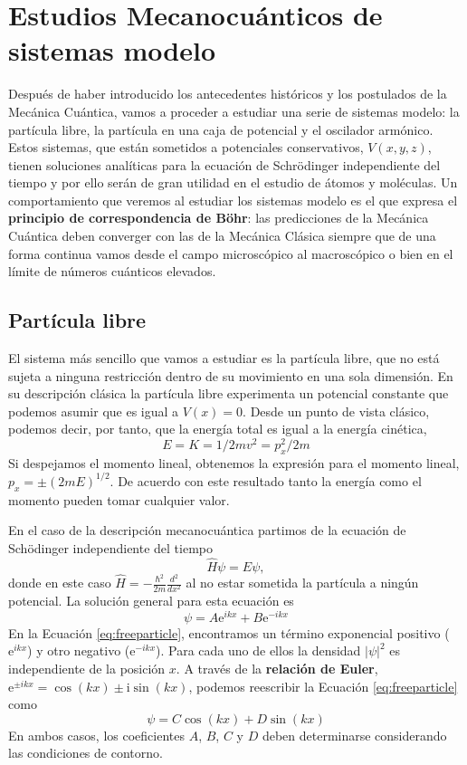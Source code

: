 \chapter{Estudios Mecanocuánticos de sistemas modelo}
Después de haber introducido los antecedentes históricos y los
postulados de la Mecánica Cuántica, vamos a proceder a 
estudiar una serie de sistemas modelo: la partícula libre, la
partícula en una caja de potencial y el oscilador armónico.
Estos sistemas, que están sometidos a potenciales conservativos,
$V(x,y,z)$, tienen soluciones analíticas para la ecuación 
de Schrödinger independiente del tiempo y por ello serán de gran
utilidad en el estudio de átomos y moléculas. Un comportamiento
que veremos al estudiar los sistemas modelo es el que expresa
el \textbf{principio de correspondencia de Böhr}:
las predicciones de la Mecánica Cuántica deben converger con 
las de la Mecánica Clásica siempre que de una forma continua vamos 
desde el campo microscópico al macroscópico o bien en el límite
de números cuánticos elevados.

\section{Partícula libre}
El sistema más sencillo que vamos a estudiar es la partícula libre,
que no está sujeta a ninguna restricción dentro de su movimiento
en una sola dimensión. En su descripción clásica la partícula libre
experimenta un potencial constante que podemos asumir que es igual a
$V(x)=0$. Desde un punto de vista clásico, podemos decir, por tanto,
que la energía total es igual a la energía cinética,
\begin{equation}
    E=K=1/2mv^2=p_x^2/2m
\end{equation}
Si despejamos el momento lineal, obtenemos la expresión para el
momento lineal, $p_x=\pm(2mE)^{1/2}$. De acuerdo con este resultado
tanto la energía como el momento pueden tomar cualquier valor.

En el caso de la descripción mecanocuántica partimos de 
la ecuación de Schödinger independiente del tiempo
\begin{equation}
    \hat{H}\psi=E\psi,
\end{equation}
donde en este caso $\hat{H}=-\frac{\hbar^2}{2m}\frac{d^2}{dx^2}$ al
no estar sometida la partícula a ningún potencial. La solución
general para esta ecuación es
\begin{equation}
    \psi = A\mathrm{e}^{ikx}+ B\mathrm{e}^{-ikx}\label{eq:freeparticle}
\end{equation}
En la Ecuación \ref{eq:freeparticle}, encontramos un término
exponencial positivo ($\mathrm{e}^{ikx}$) y otro negativo 
($\mathrm{e}^{-ikx}$). Para cada uno de ellos la densidad 
$|\psi|^2$ es independiente de la posición $x$.
A través de la \textbf{relación de Euler}, 
$\mathrm{e}^{\pm ikx}=\cos(kx)\pm\mathrm{i}\sin(kx)$, podemos reescribir
la Ecuación \ref{eq:freeparticle} como
\begin{equation}
    \psi=C\cos(kx) + D\sin(kx) \label{eq:freepangular}
\end{equation}
En ambos casos, los coeficientes
$A$, $B$, $C$ y $D$ deben determinarse considerando las condiciones
de contorno.

